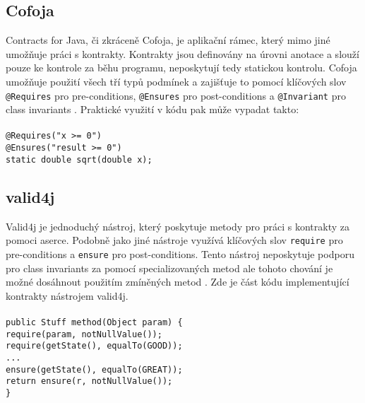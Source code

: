 	
		\subsection{Cofoja}
			Contracts for Java, či zkráceně Cofoja, je aplikační rámec, který mimo jiné umožňuje práci s kontrakty. Kontrakty jsou definovány na úrovni anotace a slouží pouze ke kontrole za běhu programu, neposkytují tedy statickou kontrolu. Cofoja umožňuje použití všech tří typů podmínek a zajišťuje to pomocí klíčových slov \texttt{@Requires} pro pre-conditions, 
\texttt{@Ensures} pro post-conditions a \texttt{@Invariant} pro class invariants \cite{cofoja}. Praktické využití v kódu pak může vypadat takto:\\\\
				\- \- \- \- \- \texttt{@Requires("x >= 0")}\\
				\- \- \- \- \- \texttt{@Ensures("result >= 0")}\\
				\- \- \- \- \- \texttt{static double sqrt(double x);}\\


		\subsection{valid4j}
			Valid4j je jednoduchý nástroj, který poskytuje metody pro práci s kontrakty za pomoci aserce. Podobně jako jiné nástroje využívá klíčových slov \texttt{require} pro pre-conditions a \texttt{ensure} pro post-conditions. Tento nástroj neposkytuje podporu pro class invariants za pomocí specializovaných metod ale tohoto chování je možné dosáhnout použitím zmíněných metod \cite{valid4j}. Zde je část kódu implementující kontrakty nástrojem valid4j.\\\\  
				\- \- \- \- \- \texttt{public Stuff method(Object param) \{}\\
				\- \- \- \- \- \- \- \- \- \- \texttt{require(param, notNullValue());}\\
				\- \- \- \- \- \- \- \- \- \- \texttt{require(getState(), equalTo(GOOD));}\\
				\- \- \- \- \- \- \- \- \- \- \texttt{...}\\
				\- \- \- \- \- \- \- \- \- \- \texttt{ensure(getState(), equalTo(GREAT));}\\
				\- \- \- \- \- \- \- \- \- \- \texttt{return ensure(r, notNullValue());}\\
				\- \- \- \- \- \texttt{\}}\\	
	

